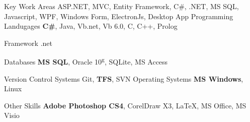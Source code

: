

\begin{cvskills}
\cvskill
{Key Work Areas} %
{ASP.NET, MVC, Entity Framework, C\#, .NET, MS SQL, Javascript, WPF, Windows Form, ElectronJs, Desktop App} %
  \cvskill
    {Programming Landugages} %
    {\textbf{C\#}, Java, Vb.net, Vb 6.0, C, C++, Prolog} %
    
 \cvskill
{Framework} %
{.net} %
  
  \cvskill
    {Databases} %
    {\textbf{MS SQL}, Oracle 10\textsuperscript{g}, SQLite, MS Access} %
    
   \cvskill
 {Version Control Systems} %
 {Git, \textbf{TFS}, SVN } %
 \cvskill
 {Operating Systems} %
 {\textbf{MS Windows}, Linux} %
 
\cvskill
{Other Skills} %
{\textbf{Adobe Photoshop CS4}, CorelDraw X3, \LaTeX, MS Office, MS Visio} %

\end{cvskills}

